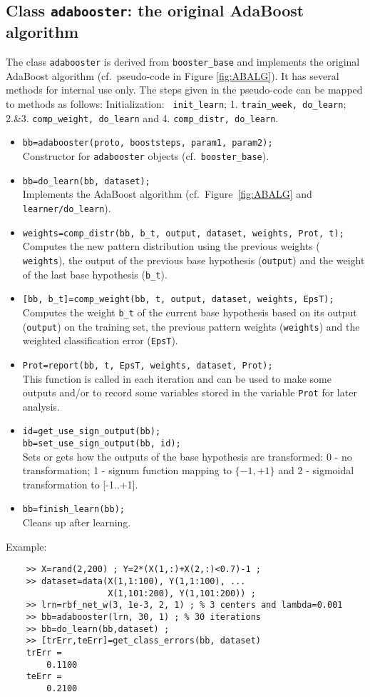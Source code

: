 \documentclass{article}
\begin{document}
\subsection{Class {\tt adabooster}: the original AdaBoost algorithm}
The class {\tt adabooster} is derived from {\tt booster\_base} and implements
the original AdaBoost algorithm \cite{FreSch94} (cf.~pseudo-code in Figure
\ref{fig:ABALG}). It has several methods for internal use only. The steps given
in the pseudo-code can be mapped to methods as follows: Initialization: {\tt
  init\_learn}; 1. {\tt train\_week, do\_learn}; 2.\&3. {\tt comp\_weight,
  do\_learn} and 4. {\tt comp\_distr, do\_learn}.
\begin{itemize}
\item {\tt bb=adabooster(proto, booststeps, param1, param2);}\\
  Constructor for {\tt adabooster} objects (cf.~{\tt booster\_base}).
\item {\tt bb=do\_learn(bb, dataset);}\\
  Implements the AdaBoost algorithm (cf.~Figure~\ref{fig:ABALG} and {\tt
    learner/do\_learn}).
\item {\tt weights=comp\_distr(bb, b\_t, output, dataset, weights, Prot,
    t);}\\
  Computes the new pattern distribution using the previous weights ({\tt
    weights}), the output of the previous base hypothesis ({\tt output}) and
  the weight of the last base hypothesis ({\tt b\_t}).
\item {\tt [bb, b\_t]=comp\_weight(bb, t, output, dataset, weights,
    EpsT);}\\
  Computes the weight {\tt b\_t} of the current base hypothesis based on its
  output ({\tt output}) on the training set, the previous pattern weights
  ({\tt weights}) and the weighted classification error ({\tt EpsT}).
\item {\tt Prot=report(bb, t, EpsT, weights, dataset, Prot);}\\
  This function is called in each iteration and can be used to make some
  outputs and/or to record some variables stored in the variable {\tt Prot}
  for later analysis.
\item  {\tt id=get\_use\_sign\_output(bb);\\
    bb=set\_use\_sign\_output(bb, id);}\\
  Sets or gets how the outputs of the base hypothesis are transformed: 0 - no
  transformation; 1 - signum function mapping to $\{-1,+1\}$ and 2 - sigmoidal
  transformation to [-1..+1].
\item {\tt bb=finish\_learn(bb);} \\
  Cleans up after learning.
\end{itemize}
Example:
\begin{verbatim}
    >> X=rand(2,200) ; Y=2*(X(1,:)+X(2,:)<0.7)-1 ;
    >> dataset=data(X(1,1:100), Y(1,1:100), ...
                    X(1,101:200), Y(1,101:200)) ;
    >> lrn=rbf_net_w(3, 1e-3, 2, 1) ; % 3 centers and lambda=0.001
    >> bb=adabooster(lrn, 30, 1) ; % 30 iterations
    >> bb=do_learn(bb,dataset) ;
    >> [trErr,teErr]=get_class_errors(bb, dataset)
    trErr =
        0.1100
    teErr =
        0.2100
\end{verbatim}
\end{document}
